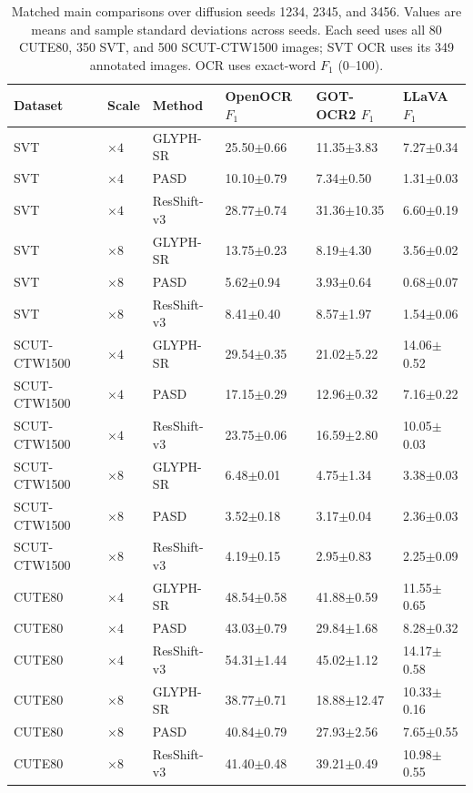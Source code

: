 \begin{table}[H]
\centering
\caption{Matched main comparisons over diffusion seeds 1234, 2345, and 3456. Values are means and sample standard deviations across seeds. Each seed uses all 80 CUTE80, 350 SVT, and 500 SCUT-CTW1500 images; SVT OCR uses its 349 annotated images. OCR uses exact-word $F_1$ (0--100).}
\label{tab:ar-main-ocr}
\small
\setlength{\tabcolsep}{4pt}
\begin{tabular}{llllll}
\toprule
Dataset & Scale & Method & OpenOCR $F_1$ & GOT-OCR2 $F_1$ & LLaVA $F_1$ \\
\midrule
SVT & $\times4$ & GLYPH-SR & 25.50$\pm$0.66 & 11.35$\pm$3.83 & 7.27$\pm$0.34 \\
SVT & $\times4$ & PASD & 10.10$\pm$0.79 & 7.34$\pm$0.50 & 1.31$\pm$0.03 \\
SVT & $\times4$ & ResShift-v3 & 28.77$\pm$0.74 & 31.36$\pm$10.35 & 6.60$\pm$0.19 \\
SVT & $\times8$ & GLYPH-SR & 13.75$\pm$0.23 & 8.19$\pm$4.30 & 3.56$\pm$0.02 \\
SVT & $\times8$ & PASD & 5.62$\pm$0.94 & 3.93$\pm$0.64 & 0.68$\pm$0.07 \\
SVT & $\times8$ & ResShift-v3 & 8.41$\pm$0.40 & 8.57$\pm$1.97 & 1.54$\pm$0.06 \\
SCUT-CTW1500 & $\times4$ & GLYPH-SR & 29.54$\pm$0.35 & 21.02$\pm$5.22 & 14.06$\pm$0.52 \\
SCUT-CTW1500 & $\times4$ & PASD & 17.15$\pm$0.29 & 12.96$\pm$0.32 & 7.16$\pm$0.22 \\
SCUT-CTW1500 & $\times4$ & ResShift-v3 & 23.75$\pm$0.06 & 16.59$\pm$2.80 & 10.05$\pm$0.03 \\
SCUT-CTW1500 & $\times8$ & GLYPH-SR & 6.48$\pm$0.01 & 4.75$\pm$1.34 & 3.38$\pm$0.03 \\
SCUT-CTW1500 & $\times8$ & PASD & 3.52$\pm$0.18 & 3.17$\pm$0.04 & 2.36$\pm$0.03 \\
SCUT-CTW1500 & $\times8$ & ResShift-v3 & 4.19$\pm$0.15 & 2.95$\pm$0.83 & 2.25$\pm$0.09 \\
CUTE80 & $\times4$ & GLYPH-SR & 48.54$\pm$0.58 & 41.88$\pm$0.59 & 11.55$\pm$0.65 \\
CUTE80 & $\times4$ & PASD & 43.03$\pm$0.79 & 29.84$\pm$1.68 & 8.28$\pm$0.32 \\
CUTE80 & $\times4$ & ResShift-v3 & 54.31$\pm$1.44 & 45.02$\pm$1.12 & 14.17$\pm$0.58 \\
CUTE80 & $\times8$ & GLYPH-SR & 38.77$\pm$0.71 & 18.88$\pm$12.47 & 10.33$\pm$0.16 \\
CUTE80 & $\times8$ & PASD & 40.84$\pm$0.79 & 27.93$\pm$2.56 & 7.65$\pm$0.55 \\
CUTE80 & $\times8$ & ResShift-v3 & 41.40$\pm$0.48 & 39.21$\pm$0.49 & 10.98$\pm$0.55 \\
\bottomrule
\end{tabular}
\end{table}
